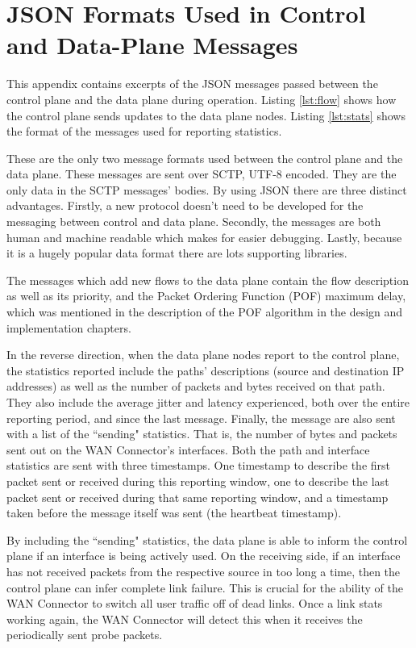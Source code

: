 

\cleardoublepage
\chapter{JSON Formats Used in Control and Data-Plane Messages}
\label{appendix:format}

This appendix contains excerpts of the JSON messages passed between the control plane and the data plane during operation. Listing \ref{lst:flow} shows how the control plane sends updates to the data plane nodes. Listing \ref{lst:stats} shows the format of the messages used for reporting statistics.

These are the only two message formats used between the control plane and the data plane. These messages are sent over SCTP, UTF-8 encoded. They are the only data in the SCTP messages' bodies. By using JSON there are three distinct advantages. Firstly, a new protocol doesn't need to be developed for the messaging between control and data plane. Secondly, the messages are both human and machine readable which makes for easier debugging. Lastly, because it is a hugely popular data format there are lots supporting libraries. 

The messages which add new flows to the data plane contain the flow description as well as its priority, and the Packet Ordering Function (POF) maximum delay, which was mentioned in the description of the POF algorithm in the design and implementation chapters.

In the reverse direction, when the data plane nodes report to the control plane, the statistics reported include the paths' descriptions (source and destination IP addresses) as well as the number of packets and bytes received on that path. They also include the average jitter and latency experienced, both over the entire reporting period, and since the last message. Finally, the message are also sent with a list of the “sending" statistics. That is, the number of bytes and packets sent out on the WAN Connector's interfaces. Both the path and interface statistics are sent with three timestamps. One timestamp to describe the first packet sent or received during this reporting window, one to describe the last packet sent or received during that same reporting window, and a timestamp taken before the message itself was sent (the heartbeat timestamp).

By including the “sending" statistics, the data plane is able to inform the control plane if an interface is being actively used. On the receiving side, if an interface has not received packets from the respective source in too long a time, then the control plane can infer complete link failure. This is crucial for the ability of the WAN Connector to switch all user traffic off of dead links. Once a link stats working again, the WAN Connector will detect this when it receives the periodically sent probe packets.

